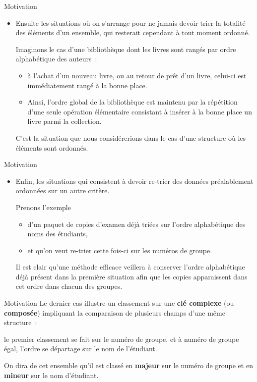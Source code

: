 \begin{frame}{Motivation}
	\begin{itemize}
		\item 
			Ensuite les situations où on s’arrange pour ne jamais devoir trier la
			totalité des éléments d’un ensemble, qui resterait cependant à tout
			moment ordonné. 
			
			Imaginons le cas d’une bibliothèque dont les livres
			sont rangés par ordre alphabétique des auteurs~: 
			\begin{itemize}
				\item
				à l’achat d’un nouveau livre, ou au retour de prêt d’un livre, 
				celui-ci est immédiatement rangé à la bonne place. 
				\item
				Ainsi, l’ordre global de la bibliothèque est
				maintenu par la répétition d’une seule opération élémentaire consistant
				à insérer à la bonne place un livre parmi la collection. 
			\end{itemize}
			C’est la	situation que nous considérerions dans le cas d'une structure
			où les éléments sont ordonnés.
	\end{itemize}
\end{frame}
	
\begin{frame}{Motivation}
	\begin{itemize}
		\item 
			Enfin, les situations qui consistent à devoir re-trier des données
			préalablement ordonnées sur un autre critère. 
			
			Prenons l’exemple 
			\begin{itemize}
				\item
				d’un paquet de copies d’examen déjà triées sur l’ordre alphabétique des noms
				des étudiants, 
				\item
				et qu’on veut re-trier cette fois-ci sur les numéros de
				groupe. 
			\end{itemize}
			Il est clair qu’une méthode efficace veillera à conserver
			l’ordre alphabétique déjà présent dans la première situation afin que
			les copies apparaissent dans cet ordre dans chacun des groupes.
	\end{itemize}
\end{frame}
	
\begin{frame}{Motivation}
	Le dernier cas illustre un classement sur une \textbf{clé complexe}
	(ou \textbf{composée}) impliquant la comparaison de plusieurs champs
	d’une même structure~: 
	
	le premier classement se fait sur le numéro de
	groupe, et à numéro de groupe égal, l’ordre se départage sur le nom de
	l’étudiant. 
	
	On dira de cet ensemble qu’il est classé en \textbf{majeur}
	sur le numéro de groupe et en \textbf{mineur} sur le nom d’étudiant.
\end{frame}


